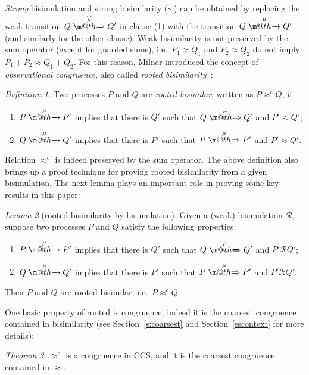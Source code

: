 \documentclass[GCNS]{yincog}
\makeatletter
\def \rightarrowfill{$\m@th\mathord{\smash-}\mkern-6mu%
  \cleaders\hbox{$\mkern-2mu\mathord{\smash-}\mkern-2mu$}\hfill
  \mkern-6mu\mathord\rightarrow$}
\def \rightarrowfillWEAK{$\m@th\mathord{\smash=}\mkern-6mu%
  \cleaders\hbox{$\mkern-2mu\mathord{\smash=}\mkern-2mu$}\hfill
  \mkern-6mu\mathord\Rightarrow$}
\theoremstyle{remark}
\newtheorem{definition}{Definition}[section]
\theoremstyle{theorem}
\newtheorem{lemma}[definition]{Lemma}
\newtheorem{theorem}[definition]{Theorem}
\theoremstyle{remark}
\newcommand{\arr}[1]{\mathrel{\stackrel{{\;\;#1\;\;}}{\mbox{\rightarrowfill}}}}
\newcommand{\Arr}[1]{\mathrel{\stackrel{{\;\;#1\;\;}}{\mbox{\rightarrowfillWEAK}}}}
\newcommand{\Arcap}[1]{\mathrel{\stackrel{{\;\;{\widehat{#1}}\;\;}}{\mbox{\rightarrowfillWEAK}}}}
\def\RRvtex{\mathrel{\mathcal{R}}}
\newcommand{\rapprox}{\mathrel{\approx^{\mathrm{c}}}}
\newcommand{\wbvtex}{\approx}
\makeatother
\begin{document}
\emph{Strong} bisimulation and strong bisimilarity ($\sim $) can be obtained
by replacing the weak transition $Q\Arcap\mu Q'$ in clause (1) with the
transition $Q \arr \mu Q'$ (and similarly for the other clause). Weak bisimilarity
is not preserved by the sum operator (except for guarded sums), i.e.~$P_1
\wbvtex Q_1$ and $P_2 \wbvtex Q_2$ do not imply
$P_1 + P_2 \wbvtex Q_1 + Q_2$. For this reason, Milner introduced the concept
of \emph{observational congruence}, also called
\emph{rooted bisimilarity}~\cite{Gorrieri:2015jt,Sangiorgi:2011ut}:
%
\begin{definition}%
 \label{d:rootedBisimilarity}
Two processes $P$ and $Q$ are \emph{rooted bisimilar}, written as
$P \rapprox Q$, if
%
\begin{enumerate}
%
\item $P \arr\mu P'$ implies that there is $Q'$ such that
$Q \Arr\mu Q'$ and $P' \wbvtex Q'$;
%
\item $Q \arr\mu Q'$ implies that there is $P'$ such that
$P \Arr\mu P'$ and $P' \wbvtex Q'$.
%
\end{enumerate}
%
\end{definition}
%
Relation $\rapprox $ is indeed preserved by the sum operator. The above
definition also brings up a proof technique for proving rooted bisimilarity
from a given bisimulation. The next lemma plays an important role in proving
some key results in this paper:
%
\begin{lemma}[rooted bisimilarity by bisimulation]
 \label{lobsCongrByWeakBisim}
Given a (weak) bisimulation $\RRvtex $, suppose two processes $P$ and
$Q$ satisfy the following properties:
%
\begin{enumerate}
%
\item $P \arr\mu P'$ implies that there is $Q'$ such that
$Q \Arr\mu Q'$ and $P' \RRvtex Q'$;
%
\item $Q \arr\mu Q'$ implies that there is $P'$ such that
$P \Arr\mu P'$ and $P' \RRvtex Q'$.
%
\end{enumerate}
%
Then $P$ and $Q$ are rooted bisimilar, i.e.~$P \approx ^{c} Q$.
\end{lemma}

One basic property of rooted  is congruence, indeed it is the
coarsest congruence contained in bisimilarity (see Section~\ref{s:coarsest}
and Section~\ref{sscontext} for more details):
%
\begin{theorem}
 \label{t:rapproxCongruence}
$\rapprox $ is a congruence in CCS, and it is the coarsest congruence contained
in $\wbvtex $.
\end{theorem}
\end{document}
